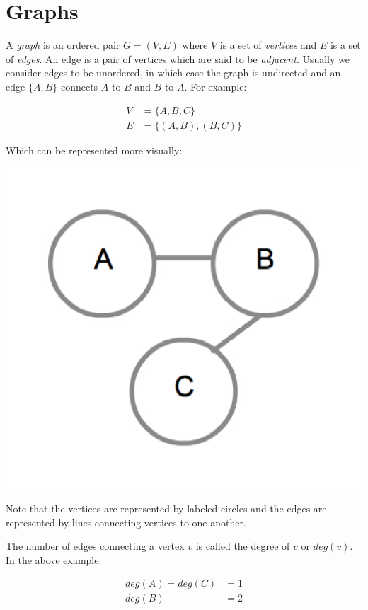 \chapter{Graphs}

A \emph{graph} is an ordered pair $G=(V,E)$ where $V$ is a set of
\emph{vertices} and $E$ is a set of \emph{edges}.  An edge is a pair
of vertices which are said to be \emph{adjacent}.  Usually we consider
edges to be unordered, in which case the graph is undirected and an
edge $\{A,B\}$ connects $A$ to $B$ and $B$ to $A$.  For example:

\begin{align*} 
V &= \{ A, B, C \} \\ E &= \{ (A, B), (B, C) \} 
\end{align*}

Which can be represented more visually:

{
  \includegraphics[scale=0.2]{SimpleGraph}
  \label{fig:SimpleGraph}
}

Note that the vertices are represented by labeled circles and the
edges are represented by lines connecting vertices to one another.

The number of edges connecting a vertex $v$ is called the degree of
$v$ or $deg(v)$.  In the above example:

\begin{align*}
deg(A) = deg(C) &= 1 \\
deg(B) &= 2
\end{align*}

